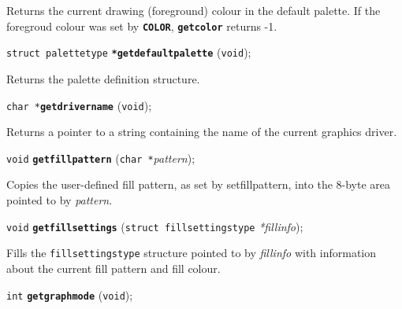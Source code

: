 \documentclass[a4paper,12pt]{article}
\newcommand{\V}{\texttt{void}}      %
\newcommand{\I}{\texttt{int}}       %
\newcommand{\C}{\texttt{char *}}    %
\newcommand{\func}[1]{\textbf{\texttt{#1}}}  %
\newcommand{\A}[1]{\emph{#1}}       %
\newenvironment{bgi}
{ %
  \begin{snugshade}
}
{ %
  \end{snugshade}
}
\begin{document}
Returns the current drawing (foreground) colour in the default
palette. If the foregroud colour was set by \func{COLOR},
\func{getcolor} returns -1.


\label{sec:getdefaultpalette}

\begin{bgi}
\texttt{struct palettetype} \func{*getdefaultpalette} (\V{});
\end{bgi}

Returns the palette definition structure.


\label{sec:getdrivername}

\begin{bgi}
\C{}\func{getdrivername} (\V{});
\end{bgi}

Returns a pointer to a string containing the name of the current
graphics driver.


\label{sec:getfillpattern}

\begin{bgi}
\V{} \func{getfillpattern} (\C{}\A{pattern});
\end{bgi}

Copies the user-defined fill pattern, as set by setfillpattern, into
the 8-byte area pointed to by \A{pattern}.


\label{sec:getfillsettings}

\begin{bgi}
\V{} \func{getfillsettings} (\texttt{struct fillsettingstype}
\A{*fillinfo});
\end{bgi}

Fills the \texttt{fillsettingstype} structure pointed to by
\A{fillinfo} with information about the current fill pattern and fill
colour.


\label{sec:getgraphmode}

\begin{bgi}
\I{} \func{getgraphmode} (\V{});
\end{bgi}
\end{document}
